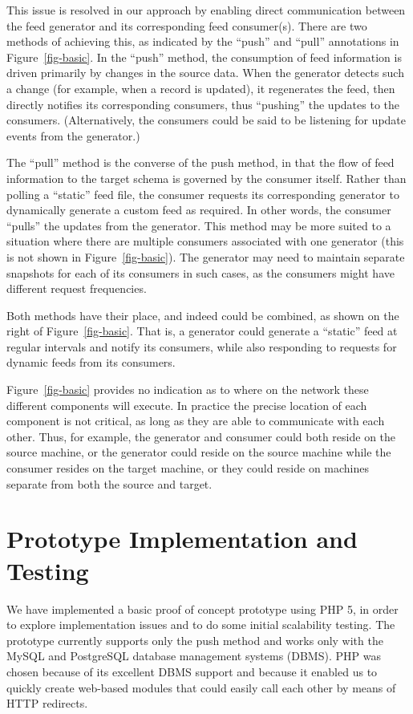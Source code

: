 \documentclass{CRPITStyle}
\begin{document}
This issue is resolved in our approach by enabling direct communication
between the feed generator and its corresponding feed consumer(s). There
are two methods of achieving this, as indicated by the ``push'' and
``pull'' annotations in Figure~\ref{fig-basic}. In the ``push'' method,
the consumption of feed information is driven primarily by changes in
the source data. When the generator detects such a change (for example,
when a record is updated), it regenerates the feed, then directly
notifies its corresponding consumers, thus ``pushing'' the updates to
the consumers. (Alternatively, the consumers could be said to be
listening for update events from the generator.)

The ``pull'' method is the converse of the push method, in that the flow
of feed information to the target schema is governed by the consumer
itself. Rather than polling a ``static'' feed file, the consumer
requests its corresponding generator to dynamically generate a custom
feed as required. In other words, the consumer ``pulls'' the updates
from the generator. This method may be more suited to a situation where
there are multiple consumers associated with one generator (this is not
shown in Figure~\ref{fig-basic}). The generator may need to maintain
separate snapshots for each of its consumers in such cases, as the
consumers might have different request frequencies.

Both methods have their place, and indeed could be combined, as shown on
the right of Figure~\ref{fig-basic}. That is, a generator could generate
a ``static'' feed at regular intervals and notify its consumers, while
also responding to requests for dynamic feeds from its consumers.

Figure~\ref{fig-basic} provides no indication as to where on the network
these different components will execute. In practice the precise
location of each component is not critical, as long as they are able to
communicate with each other. Thus, for example, the generator and
consumer could both reside on the source machine, or the generator could
reside on the source machine while the consumer resides on the target
machine, or they could reside on machines separate from both the source
and target.


\section{Prototype Implementation and Testing}
\label{sec-prototype}

We have implemented a basic proof of concept prototype using PHP 5, in
order to explore implementation issues and to do some initial
scalability testing. The prototype currently supports only the push
method and works only with the MySQL and PostgreSQL database management
systems (DBMS). PHP was chosen because of its excellent DBMS support and
because it enabled us to quickly create web-based modules that could
easily call each other by means of HTTP redirects.
\end{document}
